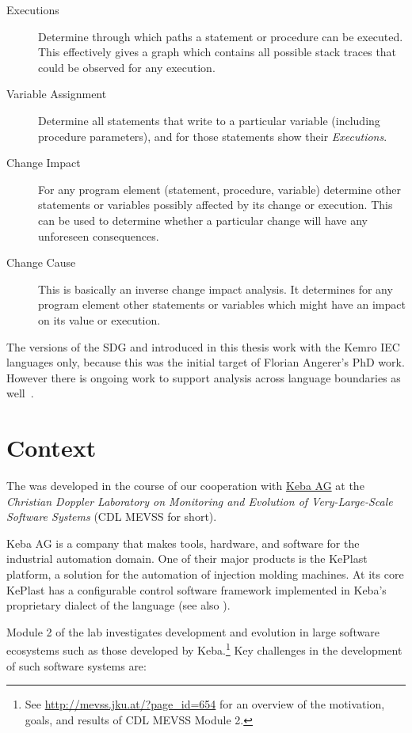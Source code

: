 \begin{description}
  \item[Executions] Determine through which paths a statement or procedure can be executed. This effectively gives a 
  graph which contains all possible stack traces that could be observed for any execution.
  
  \item[Variable Assignment] Determine all statements that write to a particular variable (including procedure 
  parameters), and for those statements show their \emph{Executions}.
  
  \item[Change Impact] For any program element (statement, procedure, variable) determine other statements or variables 
  possibly affected by its change or execution. This can be used to determine whether a particular change will have any 
  unforeseen consequences.
  
  \item[Change Cause] This is basically an inverse change impact analysis. It determines for any program element
  other statements or variables which might have an impact on its value or execution.
\end{description}

The versions of the SDG and \SB introduced in this thesis work with the Kemro IEC languages only, because this was the 
initial target of Florian Angerer's PhD work. However there is ongoing work to support analysis across language 
boundaries as well~\cite{DBLP:conf/kbse/Angerer14}.


\section{Context} \label{sec:intro-context}

The \SB was developed in the course of our cooperation with \href{http://www.keba.com}{Keba AG} at the \emph{Christian 
Doppler Laboratory on Monitoring and Evolution of Very-Large-Scale Software Systems} (CDL MEVSS for short).

Keba AG is a company that makes tools, hardware, and software for the industrial automation domain. One of their major 
products is the KePlast platform, a solution for the automation of injection molding machines. At its core KePlast has 
a configurable control software framework implemented in Keba's proprietary dialect of the \IEC language (see also 
\cite[sec.~3.1]{DBLP:conf/splc/AngererPLGG14}).

Module 2 of the lab investigates development and evolution in large software ecosystems such as those developed by 
Keba.\footnote{See \url{http://mevss.jku.at/?page_id=654} for an overview of the motivation, goals, and results of CDL 
MEVSS Module 2.}
Key challenges in the development of such software systems are:

